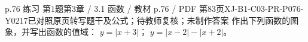 \par\noindent\begin{minipage}{\linewidth}
\begin{bankitem}{p.76 练习 第1题}{第3章 / 3.1 函数 / 教材 p.76 / PDF 第83页}{XJ-B1-C03-PR-P076-Y0217}{已对照原页转写题干及公式；待教师复核；未制作答案}
作出下列函数的图象，并写出函数的值域：
$y=|x+3|$；
$y=|x-2|-|x+2|$。
\end{bankitem}
\end{minipage}\par\medskip
